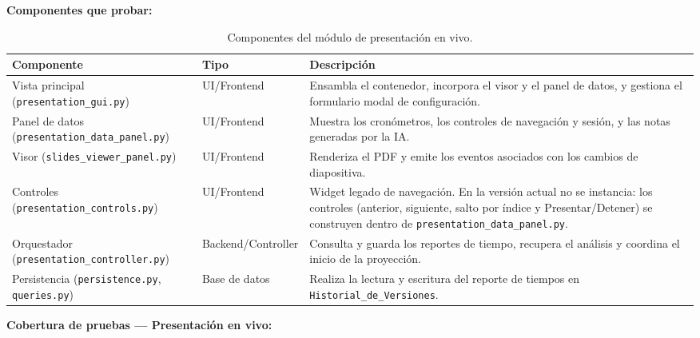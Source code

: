 \documentclass[12pt,letterpaper]{article}
\begin{document}
\textbf{Componentes que probar:}

\begin{table}[H]
    \centering
    \begin{tabular}{|L{0.34\textwidth}|L{0.18\textwidth}|L{0.38\textwidth}|}
        \hline
        \textbf{Componente} & \textbf{Tipo} & \textbf{Descripción} \\ \hline
        Vista principal (\texttt{presentation\_gui.py}) & UI/Frontend & Ensambla el contenedor, incorpora el visor y el panel de datos, y gestiona el formulario modal de configuración. \\ \hline
        Panel de datos (\texttt{presentation\_data\_panel.py}) & UI/Frontend & Muestra los cronómetros, los controles de navegación y sesión, y las notas generadas por la IA. \\ \hline
        Visor (\texttt{slides\_viewer\_panel.py}) & UI/Frontend & Renderiza el PDF y emite los eventos asociados con los cambios de diapositiva. \\ \hline
        Controles (\texttt{presentation\_controls.py}) & UI/Frontend & Widget legado de navegación. En la versión actual no se instancia: los controles (anterior, siguiente, salto por índice y Presentar/Detener) se construyen dentro de \texttt{presentation\_data\_panel.py}. \\ \hline
        Orquestador (\texttt{presentation\_controller.py}) & Backend/Controller & Consulta y guarda los reportes de tiempo, recupera el análisis y coordina el inicio de la proyección. \\ \hline
        Persistencia (\texttt{persistence.py}, \texttt{queries.py}) & Base de datos & Realiza la lectura y escritura del reporte de tiempos en \texttt{Historial\_de\_Versiones}. \\ \hline
    \end{tabular}
    \caption{Componentes del módulo de presentación en vivo.}
    \label{tab:componentes-modulo-presentacion}
\end{table}

\textbf{Cobertura de pruebas --- Presentación en vivo:}
\end{document}
